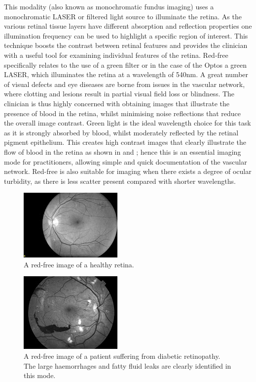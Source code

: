 This modality (also known as monochromatic fundus imaging) uses a monochromatic
LASER or filtered light source to illuminate the retina. As the various retinal
tissue layers have different absorption and reflection properties one illumination
frequency can be used to highlight a specific region of interest. This technique
boosts the contrast between retinal features and provides the clinician with a
useful tool for examining individual features of the retina. Red-free specifically
relates to the use of a green filter or in the case of the Optos a green LASER,
which illuminates the retina at a wavelength of 540nm.\cite{4_bennett_2015}
A great number of visual defects and eye diseases are borne from issues in
the vascular network, where clotting and lesions result in partial visual
field loss or blindness. The clinician is thus highly concerned with obtaining
images that illustrate the presence of blood in the retina, whilst minimising
noise reflections that reduce the overall image contrast. Green light is the
ideal wavelength choice for this task as it is strongly absorbed by blood,
whilst moderately reflected by the retinal pigment epithelium. This creates
high contrast images that clearly illustrate the flow of blood in the retina
as shown in  and ; hence this is an essential
imaging mode for practitioners, allowing simple and quick documentation of
the vascular network. Red-free is also suitable for imaging when there exists
a degree of ocular turbidity, as there is less scatter present compared with
shorter wavelengths.

\begin{figure}[htbp]
\centering
\includegraphics{figures/redfree}
\caption{A red-free image of a healthy retina.}
\label{fig:red}
   \end{figure}

\begin{figure}[htbp]
\centering
\includegraphics{figures/redfreediabetic}
\caption{A red-free image of a patient suffering from diabetic retinopathy. The large haemorrhages and fatty fluid leaks are clearly identified in this mode.}
\label{fig:reddr}
   \end{figure}



